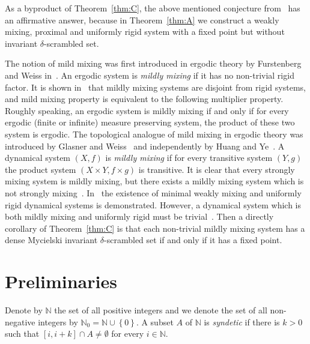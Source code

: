 \documentclass[reqno,a4paper,12pt]{amsart}
\theoremstyle{definition}
\numberwithin{equation}{section}
\begin{document}
As a byproduct of Theorem~\ref{thm:C}, the above mentioned conjecture from~\cite{BGO10} has an affirmative answer,
because in Theorem~\ref{thm:A} we construct a weakly mixing, proximal and uniformly rigid system with a fixed point but without invariant $\delta$-scrambled set.

The notion of mild mixing was first introduced in ergodic theory by Furstenberg and Weiss in~\cite{FG78}.
An ergodic system is \emph{mildly mixing} if it has no non-trivial rigid factor.
It is shown in~\cite{FG78} that mildly mixing systems are disjoint from rigid systems, and
mild mixing property is equivalent to the following multiplier property. Roughly speaking,
an ergodic system is mildly mixing if and only if for every
ergodic (finite or infinite) measure preserving system, the product of these two system is ergodic.
The topological
analogue of mild mixing in ergodic theory was introduced by Glasner and Weiss~\cite{GW06}
and independently by Huang and Ye~\cite{HY04}.
A dynamical system $(X,f)$ is \emph{mildly mixing} if for every transitive system $(Y,g)$
the product system $(X\times Y,f\times g)$ is transitive.
It is clear that every strongly mixing system is mildly mixing, but
there exists a mildly mixing system which is not strongly mixing~\cite{HY04}.
In~\cite{GM89} the existence of minimal weakly mixing and uniformly rigid
dynamical systems is demonstrated.
However, a dynamical system which is both mildly mixing and uniformly rigid
must be trivial~\cite{GW06,HY04}.
Then a directly corollary of Theorem~\ref{thm:C} is that
each non-trivial mildly mixing system has a dense Mycielski invariant $\delta$-scrambled set
if and only if it has a fixed point.

\section{Preliminaries}

Denote by ${\mathbb{N}}$ the set of all positive integers and we denote the set of all non-negative integers by ${\mathbb{N}}_0={\mathbb{N}}\cup {\left\{{0}\right\}}$.
A subset $A$ of ${\mathbb{N}}$ is \emph{syndetic} if there is $k>0$ such that $[i,i+k]\cap A\neq \emptyset$ for every $i\in {\mathbb{N}}$.
\end{document}
